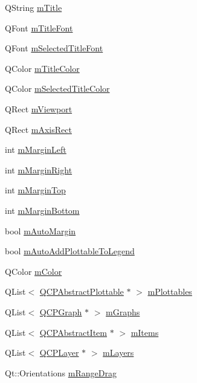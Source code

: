 \begin{DoxyCompactItemize}
\item 
Q\+String \hyperlink{a00116_a897f8f3962601be2f02346e99e1fd7fb}{m\+Title}
\item 
Q\+Font \hyperlink{a00116_ac17173c9dcdc7c84878a6ee801fafc2e}{m\+Title\+Font}
\item 
Q\+Font \hyperlink{a00116_a0857efaeb16b387fd17d6423d234cec8}{m\+Selected\+Title\+Font}
\item 
Q\+Color \hyperlink{a00116_a56e768edac99110852bf82826da144b9}{m\+Title\+Color}
\item 
Q\+Color \hyperlink{a00116_a6b947daad117396a1b6f9d9fe90094d8}{m\+Selected\+Title\+Color}
\item 
Q\+Rect \hyperlink{a00116_a69feeea9d5254eab8ba7f9be13f85e0b}{m\+Viewport}
\item 
Q\+Rect \hyperlink{a00116_aad382d311cfe6a81f47aa4ae3350021b}{m\+Axis\+Rect}
\item 
int \hyperlink{a00116_a011307bfbe2ac7e60f13d2fa45e31113}{m\+Margin\+Left}
\item 
int \hyperlink{a00116_af5efe5736378d5f8061fd6bf5dc92a2d}{m\+Margin\+Right}
\item 
int \hyperlink{a00116_a746a9e31a0cf3ce3be1bbd3a6fa2c8be}{m\+Margin\+Top}
\item 
int \hyperlink{a00116_ad02e2d81ae66d4261d1e46a6979ea118}{m\+Margin\+Bottom}
\item 
bool \hyperlink{a00116_a9f5c2927e8dd4f66342f80d3b332cd3f}{m\+Auto\+Margin}
\item 
bool \hyperlink{a00116_ada47453c490f699c82bb400d749b2cf4}{m\+Auto\+Add\+Plottable\+To\+Legend}
\item 
Q\+Color \hyperlink{a00116_ac071280171e215ffc7d416118bc28d90}{m\+Color}
\item 
Q\+List$<$ \hyperlink{a00024}{Q\+C\+P\+Abstract\+Plottable} $\ast$ $>$ \hyperlink{a00116_a57ed6eb2e0a767a8344de45110a3e81d}{m\+Plottables}
\item 
Q\+List$<$ \hyperlink{a00031}{Q\+C\+P\+Graph} $\ast$ $>$ \hyperlink{a00116_a54ed2081d9366a6c2137bf9d9f7b8371}{m\+Graphs}
\item 
Q\+List$<$ \hyperlink{a00022}{Q\+C\+P\+Abstract\+Item} $\ast$ $>$ \hyperlink{a00116_a6fcfff6ea3ccabcac8818943adb79a72}{m\+Items}
\item 
Q\+List$<$ \hyperlink{a00043}{Q\+C\+P\+Layer} $\ast$ $>$ \hyperlink{a00116_ae46b0ffefe1087007ffb11398a18a20e}{m\+Layers}
\item 
Qt\+::\+Orientations \hyperlink{a00116_a8cc4277431ae5ab8e15cf2dfe5c17e1c}{m\+Range\+Drag}
\item 

\end{DoxyCompactItemize}
